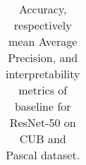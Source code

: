 \begin{table}[H]
\begin{tabular}{llccccc|ccccc}

  \end{tabular}

\caption{Accuracy, respectively mean Average Precision, and interpretability metrics of \Ours \vs baseline \gap for ResNet-50 on CUB and Pascal dataset.}
    \label{tab:pascal}
\end{table}